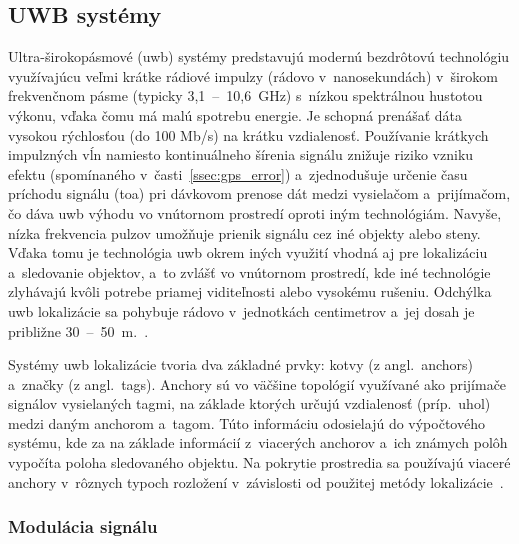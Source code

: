   \subsection{UWB systémy}
    Ultra-širokopásmové (\acrshort{uwb}) systémy predstavujú modernú bezdrôtovú technológiu využívajúcu veľmi krátke rádiové impulzy (rádovo v~nanosekundách) v~širokom frekvenčnom pásme (typicky 3,1~--~10,6\ GHz) s~nízkou spektrálnou hustotou výkonu, vďaka čomu má malú spotrebu energie. Je schopná prenášať dáta vysokou rýchlosťou (do 100 Mb/s) na krátku vzdialenosť. Používanie krátkych impulzných vĺn namiesto kontinuálneho šírenia signálu znižuje riziko vzniku  efektu (spomínaného v~časti~\ref{ssec:gps_error}) a~zjednodušuje určenie času príchodu signálu (\acrshort{toa}) pri dávkovom prenose dát medzi vysielačom a~prijímačom, čo dáva \acrshort{uwb} výhodu vo vnútornom prostredí oproti iným technológiám. Navyše, nízka frekvencia pulzov umožňuje prienik signálu cez iné objekty alebo steny. Vďaka tomu je technológia \acrshort{uwb} okrem iných využití vhodná aj pre lokalizáciu a~sledovanie objektov, a~to zvlášť vo vnútornom prostredí, kde iné technológie zlyhávajú kvôli potrebe priamej viditeľnosti alebo vysokému rušeniu. Odchýlka \acrshort{uwb} lokalizácie sa pohybuje rádovo v~jednotkách centimetrov a~jej dosah je približne 30~--~50~m.~\cite{alarifiUltraWidebandIndoor2016}.

    Systémy \acrshort{uwb} lokalizácie tvoria dva základné prvky: kotvy (z angl.\ anchors) a~značky (z angl.\ tags). Anchory sú vo väčšine topológií využívané ako prijímače signálov vysielaných tagmi, na základe ktorých určujú vzdialenosť (príp.\ uhol) medzi daným anchorom a~tagom. Túto informáciu odosielajú do výpočtového systému, kde za na základe informácií z~viacerých anchorov a~ich známych polôh vypočíta poloha sledovaného objektu. Na pokrytie prostredia sa používajú viaceré anchory v~rôznych typoch rozložení v~závislosti od použitej metódy lokalizácie~\cite{al-okbyUWBBasedRealTimeIndoor2024}.

    \subsubsection{Modulácia signálu}
    
